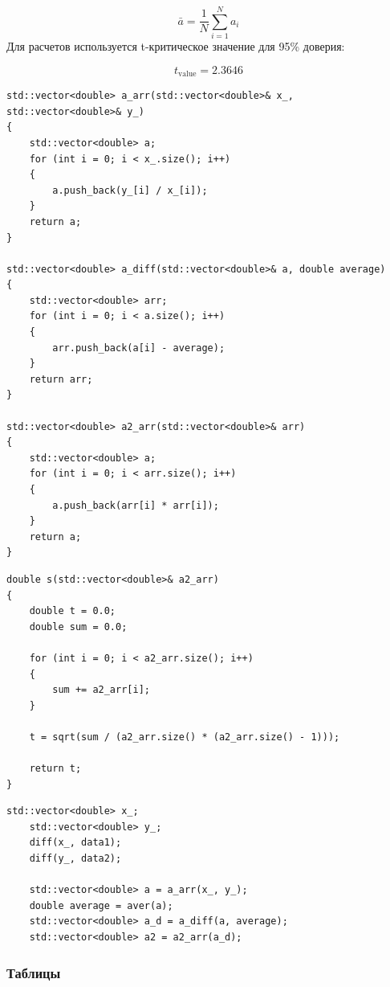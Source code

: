 \[
\bar{a} = \frac{1}{N} \sum_{i=1}^{N} a_i
\]
Для расчетов используется t-критическое значение для 95\% доверия:

\[
t_{\text{value}} = 2.3646
\]

\begin{lstlisting}[label=listing2, caption=Функции для расчета отклонений]
std::vector<double> a_arr(std::vector<double>& x_, std::vector<double>& y_)
{
	std::vector<double> a;
	for (int i = 0; i < x_.size(); i++)
	{
		a.push_back(y_[i] / x_[i]);
	}
	return a;
}

std::vector<double> a_diff(std::vector<double>& a, double average)
{
	std::vector<double> arr;
	for (int i = 0; i < a.size(); i++)
	{
		arr.push_back(a[i] - average);
	}
	return arr;
}

std::vector<double> a2_arr(std::vector<double>& arr)
{
	std::vector<double> a;
	for (int i = 0; i < arr.size(); i++)
	{
		a.push_back(arr[i] * arr[i]);
	}
	return a;
}

\end{lstlisting}

\begin{lstlisting}[label=listing3, caption=Функция вычисление стандартной ошибки среднего]
double s(std::vector<double>& a2_arr)
{
	double t = 0.0;
	double sum = 0.0;

	for (int i = 0; i < a2_arr.size(); i++)
	{
		sum += a2_arr[i];
	}

	t = sqrt(sum / (a2_arr.size() * (a2_arr.size() - 1)));

	return t;
}

\end{lstlisting}

\begin{lstlisting}[label=listing4, caption=Код программы реализующим метод парных точек]
	std::vector<double> x_;
	std::vector<double> y_;
	diff(x_, data1);
	diff(y_, data2);

	std::vector<double> a = a_arr(x_, y_);
	double average = aver(a);
	std::vector<double> a_d = a_diff(a, average);
	std::vector<double> a2 = a2_arr(a_d);
\end{lstlisting}

\subsubsection{Таблицы}

